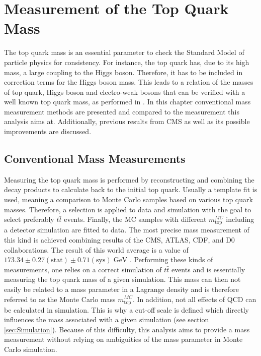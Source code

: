 \chapter{Measurement of the Top Quark Mass}
\label{ch:Measure}
	The top quark mass is an essential parameter to check the Standard Model of particle physics for consistency. For instance, the top quark has, due to its high mass, a large coupling to the Higgs boson. Therefore, it has to be included in correction terms for the Higgs boson mass. This leads to a relation of the masses of top quark, Higgs boson and electro-weak bosons that can be verified with a well known top quark mass, as performed in \cite{ewfit}. In this chapter conventional mass measurement methods are presented and compared to the measurement this analysis aims at. Additionally, previous results from CMS as well as its possible improvements are discussed. 
	
\section{Conventional Mass Measurements}
	Measuring the top quark mass is performed by reconstructing and combining the decay products to calculate back to the initial top quark. Usually a template  fit is used, meaning a comparison to Monte Carlo samples based on various top quark masses. Therefore, a selection is applied to data and simulation with the goal to select preferably $t\bar{t}$ events. Finally, the MC samples with different $m_\text{top}^{MC}$ including a detector simulation are fitted to data. The most precise mass measurement of this kind is achieved combining results of the CMS, ATLAS, CDF, and D0 collaborations. The result of this world average is a value of $173.34 \pm 0.27 (\text{stat}) \pm 0.71 (\text{sys})\;\text{GeV}$ \cite{topmass_combination}. Performing these kinds of measurements, one relies on a correct simulation of $t\bar{t}$ events and is essentially measuring the top quark mass of a given simulation. This mass can then not easily be related to a mass parameter in a Lagrange density and is therefore referred to as the Monte Carlo mass $m_\text{top}^{MC}$. In addition, not all effects of QCD can be calculated \cite{nonperturbative} in simulation. This is why a cut-off scale \cite{cutoff} is defined which directly influences the mass associated with a given simulation (see section \ref{sec:Simulation}). Because of this difficulty, this analysis aims to provide a mass measurement without relying on ambiguities of the mass parameter in Monte Carlo simulation.

